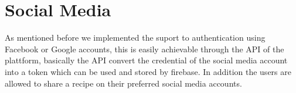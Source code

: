 \section{Social Media}
As mentioned before we implemented the suport to authentication using Facebook or Google accounts, this is easily achievable through the API of the plattform, basically the API convert the credential of the social media account into a token which can be used and stored by firebase. 
In addition the users are allowed to share a recipe on their preferred social media accounts.
